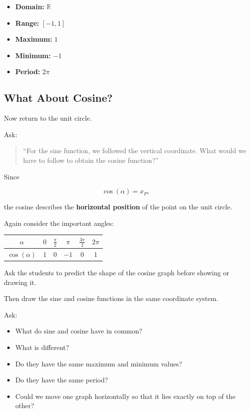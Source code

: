 \documentclass[a4paper,11pt]{article}
\begin{document}
\begin{itemize}
    \item \textbf{Domain:} $\mathbb{R}$
    \item \textbf{Range:} $[-1,1]$
    \item \textbf{Maximum:} $1$
    \item \textbf{Minimum:} $-1$
    \item \textbf{Period:} $2\pi$
\end{itemize}
\subsection*{ What About Cosine?}

Now return to the unit circle.

Ask:

\begin{quote}
    ``For the sine function, we followed the vertical coordinate.
    What would we have to follow to obtain the cosine function?''
\end{quote}

Since

\begin{equation}
    \cos(\alpha)=x_P,
\end{equation}

the cosine describes the \textbf{horizontal position} of the point on
the unit circle.

Again consider the important angles:

\begin{center}
\begin{tabular}{c|ccccc}
$\alpha$
& $0$
& $\frac{\pi}{2}$
& $\pi$
& $\frac{3\pi}{2}$
& $2\pi$ \\ \hline
$\cos(\alpha)$
& $1$
& $0$
& $-1$
& $0$
& $1$
\end{tabular}
\end{center}

Ask the students to predict the shape of the cosine graph before
showing or drawing it.

Then draw the sine and cosine functions in the same coordinate system.

Ask:

\begin{itemize}
    \item What do sine and cosine have in common?
    \item What is different?
    \item Do they have the same maximum and minimum values?
    \item Do they have the same period?
    \item Could we move one graph horizontally so that it lies exactly
    on top of the other?
\end{itemize}
\end{document}

